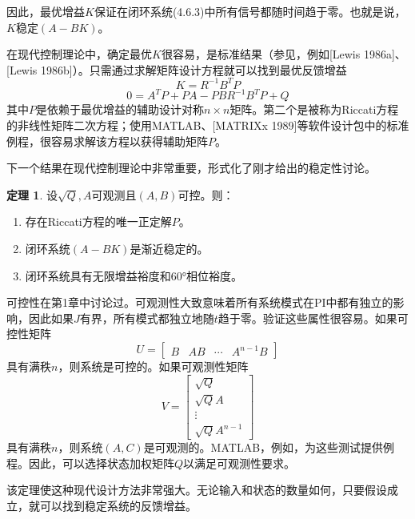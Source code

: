 \documentclass[UTF8]{ctexart}
\theoremstyle{definition}
\newtheorem{theorem}{定理}[section]
\begin{document}
因此，最优增益$K$保证在闭环系统(4.6.3)中所有信号都随时间趋于零。也就是说，$K$稳定$(A - BK)$。

在现代控制理论中，确定最优$K$很容易，是标准结果（参见，例如[Lewis 1986a]、[Lewis 1986b]）。只需通过求解矩阵设计方程就可以找到最优反馈增益
\begin{equation}
    K = R^{-1}B^TP
\end{equation}
\begin{equation}
    0 = A^TP + PA - PBR^{-1}B^TP + Q
\end{equation}
其中$P$是依赖于最优增益的辅助设计对称$n \times n$矩阵。第二个是被称为Riccati方程的非线性矩阵二次方程；使用MATLAB、[MATRIXx 1989]等软件设计包中的标准例程，很容易求解该方程以获得辅助矩阵$P$。

下一个结果在现代控制理论中非常重要，形式化了刚才给出的稳定性讨论。

\begin{theorem}
设$\sqrt{Q}, A$可观测且$(A, B)$可控。则：
\begin{enumerate}[label=(\alph*)]
\item 存在Riccati方程的唯一正定解$P$。
\item 闭环系统$(A - BK)$是渐近稳定的。
\item 闭环系统具有无限增益裕度和$60°$相位裕度。
\end{enumerate}
\end{theorem}

可控性在第1章中讨论过。可观测性大致意味着所有系统模式在PI中都有独立的影响，因此如果$J$有界，所有模式都独立地随$t$趋于零。验证这些属性很容易。如果可控性矩阵
\begin{equation}
    U = \begin{bmatrix} B & AB & \cdots & A^{n-1}B \end{bmatrix}
\end{equation}
具有满秩$n$，则系统是可控的。如果可观测性矩阵
\begin{equation}
    V = \begin{bmatrix} \sqrt{Q} \\ \sqrt{Q}A \\ \vdots \\ \sqrt{Q}A^{n-1} \end{bmatrix}
\end{equation}
具有满秩$n$，则系统$(A, C)$是可观测的。MATLAB，例如，为这些测试提供例程。因此，可以选择状态加权矩阵$Q$以满足可观测性要求。

该定理使这种现代设计方法非常强大。无论输入和状态的数量如何，只要假设成立，就可以找到稳定系统的反馈增益。
\end{document}
